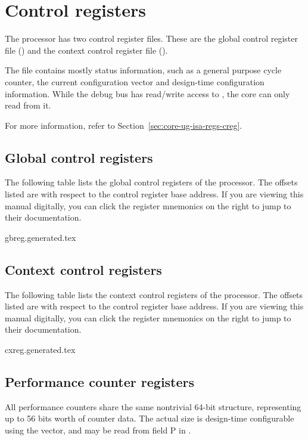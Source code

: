 
\clearpage
\section{Control registers}
\label{sec:core-ug-creg}

The \rvex{} processor has two control register files. These are the global 
control register file () and the context control register file 
().

The  file contains mostly status information, such as a general 
purpose cycle counter, the current configuration vector and design-time 
configuration information. While the debug bus has read/write access to 
, the core can only read from it.

For more information, refer to Section~\ref{sec:core-ug-isa-regs-creg}.

\subsection{Global control registers}
\label{sec:core-ug-creg-gb}

The following table lists the global control registers of the \rvex{} processor. 
The offsets listed are with respect to the control register base address. If you 
are viewing this manual digitally, you can click the register mnemonics on the 
right to jump to their documentation.

{gbreg.generated.tex}

\subsection{Context control registers}
\label{sec:core-ug-creg-cx}

The following table lists the context control registers of the \rvex{} 
processor. The offsets listed are with respect to the control register base 
address. If you are viewing this manual digitally, you can click the register 
mnemonics on the right to jump to their documentation.

{cxreg.generated.tex}

\subsection{Performance counter registers}
\label{sec:core-ug-creg-perf}

All performance counters share the same nontrivial 64-bit structure,
representing up to 56 bits worth of counter data. The actual size is design-time
configurable using the  vector, and may be read from field P in
.

